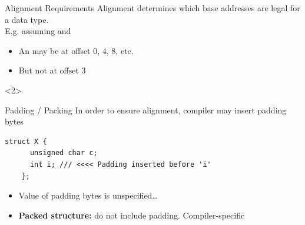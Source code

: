 \begin{frame}{Alignment Requirements}
  Alignment determines which base addresses are legal for a data type.\\[1em]

  E.g. assuming  and 
  \begin{itemize}
  \item An  may be at offset $0$, $4$, $8$, etc.

  \item But not at offset $3$
  \end{itemize}

  \begin{onlyenv}<2>
  \end{onlyenv}
\end{frame}

\begin{frame}[fragile]{Padding / Packing}
  In order to ensure alignment, compiler may insert padding bytes
  \begin{lstlisting}[style=c++]
    struct X {
      unsigned char c;
      int i; /// <<<< Padding inserted before 'i'
    };
  \end{lstlisting}

  \vfill
  \begin{itemize}
    \itemsep=1ex
  \item Value of padding bytes is unspecified\ldots

  \item {\bfseries Packed structure:} do not include padding. \alert{Compiler-specific} ~~\NotOK
  \end{itemize}
\end{frame}
